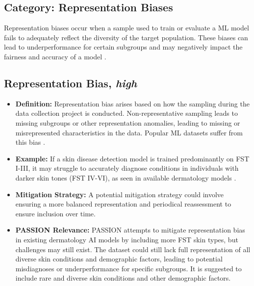 \documentclass[12pt, a4paper, oneside]{book}   	%
\begin{document}
\begin{appendices}
		
		\section{Category: Representation Biases}\label{app:biasCategoryRepresentationBiasesHigh}
		Representation biases occur when a sample used to train or evaluate a \gls{ML} model fails to adequately reflect the diversity of the target population. These biases can lead to underperformance for certain subgroups and may negatively impact the fairness and accuracy of a model \autocite{Mehrabi_2021}.
		
		\subsection{Representation Bias, \textit{high}}
		\begin{itemize}
			\item \textbf{Definition:} Representation bias arises based on how the sampling during the data collection project is conducted. Non-representative sampling leads to missing subgroups or other representation anomalies, leading to missing or misrepresented characteristics in the data. Popular \gls{ML} datasets suffer from this bias \autocite{Mehrabi_2021,M142_Shankar_2017}.
			\item \textbf{Example:} If a skin disease detection model is trained predominantly on \gls{FST} I-III, it may struggle to accurately diagnose conditions in individuals with darker skin tones (\gls{FST} IV-VI), as seen in available dermatology models \autocite{Gottfrois2024}.
			\item \textbf{Mitigation Strategy:} A potential mitigation strategy could involve ensuring a more balanced representation and periodical reassessment to ensure inclusion over time.
			\item \textbf{PASSION Relevance:} PASSION attempts to mitigate representation bias in existing dermatology \gls{AI} models by including more FST skin types, but challenges may still exist. The dataset could still lack full representation of all diverse skin conditions and demographic factors, leading to potential misdiagnoses or underperformance for specific subgroups.
			It is suggested to include rare and diverse skin conditions and other demographic factors.
		\end{itemize}
		

\end{appendices}
\end{document}
